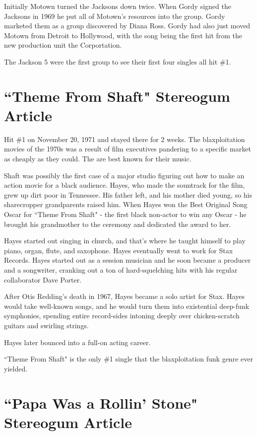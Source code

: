 \documentclass[12pt, a4paper, twoside, openright, titlepage]{book}
\begin{document}
Initially Motown turned the Jacksons down twice. When Gordy signed the Jacksons in 1969 he put all of Motown's resources into the group. Gordy marketed them as a group discovered by Diana Ross. Gordy had also just moved Motown from Detroit to Hollywood, with the song being the first hit from the new production unit the Corportation.

The Jackson 5 were the first group to see their first four singles all hit \#1.


\section{``Theme From Shaft" Stereogum Article}

Hit \#1 on November 20, 1971 and stayed there for 2 weeks. The blaxploitation movies of the 1970s was a result of film executives pandering to a specific market as cheaply as they could. The are best known for their music. 

Shaft was possibly the first case of a major studio figuring out how to make an action movie for a black audience. Hayes, who made the sountrack for the film, grew up dirt poor in Tennessee. His father left, and his mother died young, so his sharecropper grandparents raised him. When Hayes won the Best Original Song Oscar for ``Theme From Shaft" - the first black non-actor to win any Oscar - he brought his grandmother to the ceremony and dedicated the award to her. 

Hayes started out singing in church, and that's where he taught himself to play piano, organ, flute, and saxophone. Hayes eventually went to work for Stax Records. Hayes started out as a session musician and he soon became a producer and a songwriter, cranking out a ton of hard-squelching hits with his regular collaborator Dave Porter.

After Otis Redding's death in 1967, Hayes became a solo artist for Stax. Hayes would take well-known songs, and he would turn them into existential deep-funk symphonies, spending entire record-sides intoning deeply over chicken-scratch guitars and swirling strings.

Hayes later bounced into a full-on acting career.

``Theme From Shaft" is the only \#1 single that the blaxploitation funk genre ever yielded.



\section{``Papa Was a Rollin' Stone" Stereogum Article}
\end{document}

